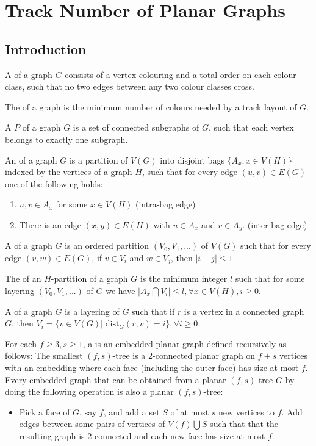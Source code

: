 \documentclass[../main.tex]{subfiles}
\begin{document}
	\section{Track Number of Planar Graphs}
	\subsection{Introduction}
	
	A  of a graph $G$ consists of a vertex colouring and a total order on each colour class, such that no two edges between any two colour classes cross.
	
	
	The  of a graph is the minimum number of colours needed by a track layout of $G$.
	
	
	A  $P$ of a graph $G$ is a set of connected subgraphs of $G$, such that each vertex belongs to exactly one subgraph.
	
	
	An  of a graph $G$ is a partition of $V(G)$ into disjoint bags $\{A_x: x\in V(H)\}$ indexed by the vertices of a graph $H$, such that for every edge $(u,v)\in E(G)$ one of the following holds: 
	\begin{enumerate}
		\item $u,v \in A_x$ for some $x\in V(H)$ (intra-bag edge)
		\item There is an edge $(x,y) \in E(H)$ with $u\in A_x$ and $v \in A_y$. (inter-bag edge)
	\end{enumerate}
	
	
	A  of a graph $G$ is an ordered partition $(V_0, V_1, ...)$ of $V(G)$ such that for every edge $(v,w)\in E(G)$, if $v\in V_i$ and $w\in V_j$, then $|i-j|\le1$
	
	The  of an $H$-partition of a graph $G$ is the minimum integer $l$ such that for some layering $(V_0, V_1,...)$ of $G$ we have $|A_x\bigcap V_i|\le l, \forall x\in V(H), i\ge0$.
	
	A  of a graph $G$ is a layering of $G$ such that if $r$ is a vertex in a connected graph $G$, then $V_i=\{v \in V(G) |\; \text{dist}_G(r,v)=i\}, \forall i\ge 0$.
	
	For each $f \ge 3, s\ge 1$, a  is an embedded planar graph defined recursively as follows: The smallest $(f,s)$-tree is a 2-connected planar graph on $f+s$ vertices with an embedding where each face (including the outer face) has size at most $f$. Every embedded graph that can be obtained from a planar $(f,s)$-tree $G$ by doing the following operation is also a planar $(f,s)$-tree:
	\begin{itemize}
		\item Pick a face of $G$, say $f$, and add a set $S$ of at most $s$ new vertices to $f$. Add edges between some pairs of vertices of $V(f)\bigcup S$ such that that the resulting graph is 2-connected and each new face has size at most $f$.
	\end{itemize}
	
\end{document}
